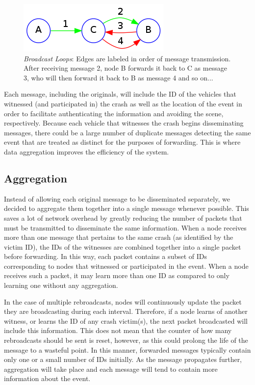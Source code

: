 \documentclass{IEEEtran}
\begin{document}
\begin{figure}
 \includegraphics[width=\linewidth,keepaspectratio=true]{broadcast_loop.png}
  \caption{\emph{Broadcast Loops}: Edges are labeled in order of message transmission.  After receiving message 2, node B forwards it back to C as message 3, who will then forward it back to B as message 4 and so on...}
  \label{broadcast_loop}
\end{figure}

Each message, including the originals, will include the ID of the vehicles that witnessed (and participated in) the crash as well as the location of the event in order to facilitate authenticating the information and avoiding the scene, respectively.
Because each vehicle that witnesses the crash begins disseminating messages, there could be a large number of duplicate messages detecting the same event that are treated as distinct for the purposes of forwarding.
This is where data aggregation improves the efficiency of the system.

\subsection{Aggregation}

Instead of allowing each original message to be disseminated separately, we decided to aggregate them together into a single message whenever possible.
This saves a lot of network overhead by greatly reducing the number of packets that must be transmitted to disseminate the same information.
When a node receives more than one message that pertains to the same crash (as identified by the victim ID), the IDs of the witnesses are combined together into a single packet before forwarding.
In this way, each packet contains a subset of IDs corresponding to nodes that witnessed or participated in the event.
When a node receives such a packet, it may learn more than one ID as compared to only learning one without any aggregation.

In the case of multiple rebroadcasts, nodes will continuously update the packet they are broadcasting during each interval.
Therefore, if a node learns of another witness, or learns the ID of any crash victim(s), the next packet broadcasted will include this information.
This does not mean that the counter of how many rebroadcasts should be sent is reset, however, as this could prolong the life of the message to a wasteful point.
In this manner, forwarded messages typically contain only one or a small number of IDs initially.
As the message propagates further, aggregation will take place and each message will tend to contain more information about the event.
\end{document}
